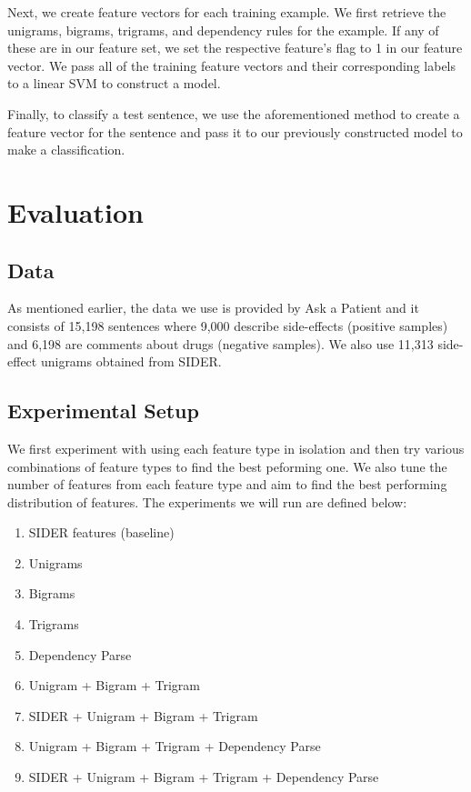 \documentclass{acm_proc_article-sp}
\begin{document}
Next, we create feature vectors for each training example. We first retrieve the unigrams, bigrams, trigrams, and dependency rules for the example. If any of these are in our feature set, we set the respective feature's flag to 1 in our feature vector. We pass all of the training feature vectors and their corresponding labels to a linear SVM to construct a model.

Finally, to classify a test sentence, we use the aforementioned method to create a feature vector for the sentence and pass it to our previously constructed model to make a classification. 

\section{Evaluation}
\vspace{2mm}
\subsection{Data}
As mentioned earlier, the data we use is provided by Ask a Patient and it consists of 15,198 sentences where 9,000 describe side-effects (positive samples) and 6,198 are comments about drugs (negative samples). We also use 11,313 side-effect unigrams obtained from SIDER.

\subsection{Experimental Setup}
We first experiment with using each feature type in isolation and then try various combinations of feature types to find the best peforming one. We also tune the number of features from each feature type and aim to find the best performing distribution of features. The experiments we will run are defined below:
\vspace{-3mm}
\begin{enumerate}
\setlength\itemsep{0.2em}
\item SIDER features (baseline)
\item Unigrams
\item Bigrams
\item Trigrams
\item Dependency Parse 
\item Unigram + Bigram + Trigram
\item SIDER + Unigram + Bigram + Trigram
\item Unigram + Bigram + Trigram + Dependency Parse
\item SIDER + Unigram + Bigram + Trigram + Dependency Parse
\end{enumerate}
\end{document}
